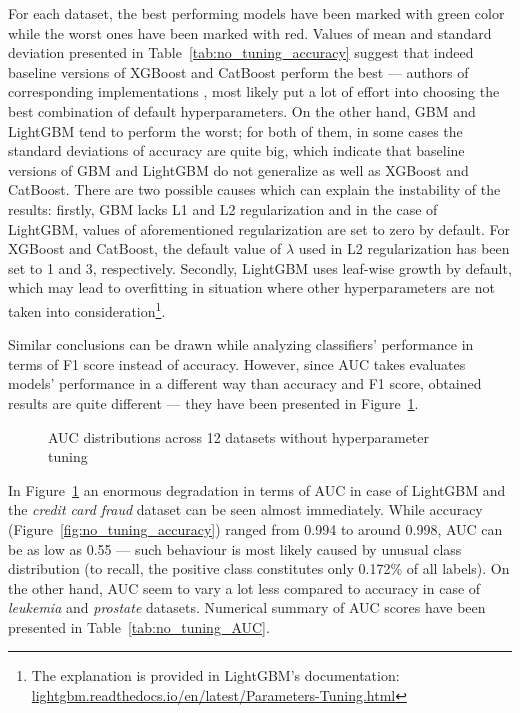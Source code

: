 \documentclass[magisterska, english]{pwr_wmat_praca_dyplomowa}
\theoremstyle{plain}
\numberwithin{theorem}{chapter}
\theoremstyle{definition}
\numberwithin{theorem}{chapter}
\begin{document}
For each dataset, the best performing models have been marked with green color while the worst ones have been marked with red. Values of mean and standard deviation presented in Table~\ref{tab:no_tuning_accuracy} suggest that indeed baseline versions of XGBoost and CatBoost perform the best --- authors of corresponding implementations \cite{xgboost}, \cite{catboost} most likely put a lot of effort into choosing the best combination of default hyperparameters. On the other hand, GBM and LightGBM tend to perform the worst; for both of them, in some cases the standard deviations of accuracy are quite big, which indicate that baseline versions of GBM and LightGBM do not generalize as well as XGBoost and CatBoost. There are two possible causes which can explain the instability of the results: firstly, GBM lacks L1 and L2 regularization and in the case of LightGBM, values of aforementioned regularization are set to zero by default. For XGBoost and CatBoost, the default value of $\lambda$ used in L2 regularization has been set to 1 and 3, respectively. Secondly, LightGBM uses leaf-wise growth by default, which may lead to overfitting in situation where other hyperparameters are not taken into consideration\footnote{The explanation is provided in LightGBM's documentation: \url{lightgbm.readthedocs.io/en/latest/Parameters-Tuning.html}}.  

Similar conclusions can be drawn while analyzing classifiers' performance in terms of F1 score instead of accuracy. However, since AUC takes evaluates models' performance in a different way than accuracy and F1 score, obtained results are quite different --- they have been presented in Figure~\ref{fig:no_tuning_AUC}. 
 
\iffalse
\begin{figure}[H]
	\centering
		\scalebox{0.42}{\texttt{[image: main/plots/results\_f1\_score\_12\_datasets\_no\_tuning\_150\_50\_trees\_facet.pdf]}}
	\caption{F1 score distributions across 12 datasets without hyperparameter tuning}
	\label{fig:no_tuning_F1}
\end{figure}
\fi

\begin{figure}[H]
	\centering
	\caption{AUC distributions across 12 datasets without hyperparameter tuning}
	\label{fig:no_tuning_AUC}
\end{figure}

In Figure~\ref{fig:no_tuning_AUC} an enormous degradation in terms of AUC in case of LightGBM and the \emph{credit card fraud} dataset can be seen almost immediately. While accuracy (Figure~\ref{fig:no_tuning_accuracy}) ranged from 0.994 to around 0.998, AUC can be as low as 0.55 --- such behaviour is most likely caused by unusual class distribution (to recall, the positive class constitutes only 0.172\% of all labels). On the other hand, AUC seem to vary a lot less compared to accuracy in case of \emph{leukemia} and \emph{prostate} datasets. Numerical summary of AUC scores have been presented in Table~\ref{tab:no_tuning_AUC}.
\end{document}
